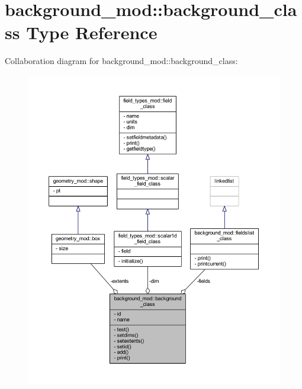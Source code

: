 \hypertarget{structbackground__mod_1_1background__class}{}\section{background\+\_\+mod\+:\+:background\+\_\+class Type Reference}
\label{structbackground__mod_1_1background__class}


Collaboration diagram for background\+\_\+mod\+:\+:background\+\_\+class\+:\nopagebreak
\begin{figure}[H]
\begin{center}
\leavevmode
\includegraphics[width=350pt]{structbackground__mod_1_1background__class__coll__graph}
\end{center}
\end{figure}
